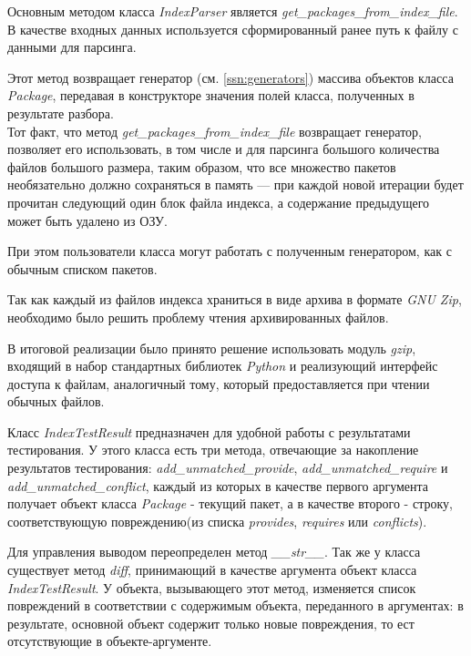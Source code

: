 Основным методом класса \textit{IndexParser} является \textit{get\_packages\_from\_index\_file}.
В качестве входных данных используется сформированный ранее путь к файлу с данными
для парсинга. 

Этот метод возвращает генератор (см. \ref{ssn:generators}) массива объектов класса \textit{Package},
передавая в конструкторе значения полей класса, полученных в результате разбора.\\

Тот факт, что метод \textit{get\_packages\_from\_index\_file} возвращает генератор, позволяет
его использовать, в том числе и для парсинга большого количества файлов большого размера, 
таким образом, что все множество пакетов необязательно должно сохраняться в память ---
при каждой новой итерации будет прочитан следующий один блок файла индекса, 
а содержание предыдущего может быть удалено из ОЗУ.

При этом пользователи класса могут работать с полученным генератором, как с обычным списком пакетов.

Так как каждый из файлов индекса храниться в виде архива в формате \textit{GNU Zip}, 
необходимо было решить проблему чтения архивированных файлов.

В итоговой реализации было принято решение использовать модуль \textit{gzip}, 
входящий в набор стандартных библиотек \textit{Python} и реализующий интерфейс доступа к файлам,
аналогичный тому, который предоставляется при чтении обычных файлов.

Класс \textit{IndexTestResult} предназначен для удобной работы с результатами тестирования. 
У этого класса есть три метода, отвечающие за накопление результатов тестирования:
\textit{add\_unmatched\_provide}, \textit{add\_unmatched\_require} и \textit{add\_unmatched\_conflict}, каждый из которых
в качестве первого аргумента получает объект класса \textit{Package} - текущий пакет, а в качестве второго
- строку, соответствующую повреждению(из списка \textit{provides}, \textit{requires} или \textit{conflicts}).

Для управления выводом переопределен метод \textit{\_\_str\_\_}. Так же у класса существует метод \textit{diff},
принимающий в качестве аргумента объект класса \textit{IndexTestResult}. У объекта, 
вызывающего этот метод, изменяется список повреждений в соответствии с содержимым объекта,
переданного в аргументах: в результате, основной объект содержит только новые повреждения,
то ест отсутствующие в объекте-аргументе.\\

